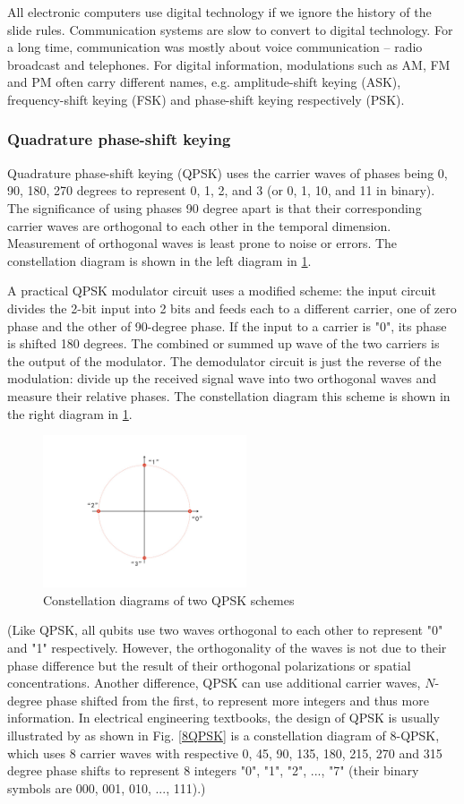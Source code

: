 \documentclass{book}
\begin{document}
All electronic computers use digital technology if we ignore the history of the slide rules. Communication systems are slow to convert to digital technology. For a long time, communication was mostly about voice communication -- radio broadcast and telephones. For digital information, modulations such as AM, FM and PM often carry different names, e.g. amplitude-shift keying (ASK), frequency-shift keying (FSK) and phase-shift keying respectively (PSK).

\subsubsection{Quadrature phase-shift keying}
 Quadrature phase-shift keying (QPSK) uses the carrier waves of phases being 0, 90, 180, 270 degrees to represent 0, 1, 2, and 3 (or 0, 1, 10, and 11 in binary). The significance of using phases 90 degree apart is that their corresponding carrier waves are orthogonal to each other in the temporal dimension. Measurement of orthogonal waves is least prone to noise or errors. The constellation diagram is shown in the left diagram in \ref{QPSK}.
 
 A practical QPSK modulator circuit\cite{qpsk-circuits} uses a modified scheme: the input circuit divides the 2-bit input into 2 bits and feeds each to a different carrier, one of zero phase and the other of 90-degree phase. If the input to a carrier is "0", its phase is shifted 180 degrees. The combined or summed up wave of the two carriers is the output of the modulator. The demodulator circuit is just the reverse of the modulation: divide up the received signal wave into two orthogonal waves and measure their relative phases. The constellation diagram this scheme is shown in the right diagram in \ref{QPSK}.

\begin{figure}[ht]
\includegraphics[width=6cm]{pic/4qpsk.jpg}
\caption{Constellation diagrams of two QPSK schemes}
\label{QPSK}
\end{figure}

(Like QPSK, all qubits use two waves orthogonal to each other to represent "0" and "1" respectively. However, the orthogonality of the waves is not due to their phase difference but the result of their orthogonal polarizations or spatial concentrations. Another difference, QPSK can use additional carrier waves, $N$-degree phase shifted from the first, to represent more integers and thus more information. In electrical engineering textbooks, the design of QPSK is usually illustrated by as shown in Fig. \ref{8QPSK} is a constellation diagram of 8-QPSK, which uses 8 carrier waves with respective 0, 45, 90, 135, 180, 215, 270 and 315 degree phase shifts to represent 8 integers "0", "1", "2", ..., "7" (their binary symbols are 000, 001, 010, ..., 111).)
\end{document}
